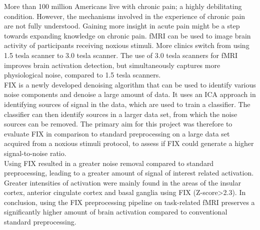 {\small More than 100 million Americans live with chronic pain; a highly debilitating condition. However, the mechanisms involved in the experience of chronic pain are not fully understood. Gaining more insight in acute pain might be a step towards expanding knowledge on chronic pain. fMRI can be used to image brain activity of participants receiving noxious stimuli. More clinics switch from using 1.5 tesla scanner to 3.0 tesla scanner. The use of 3.0 tesla scanners for fMRI improves brain activation detection, but simultaneously captures more physiological noise, compared to 1.5 tesla scanners. \\
FIX is a newly developed denoising algorithm that can be used to identify various noise components and denoise a large amount of data. It uses an ICA approach in identifying sources of signal in the data, which are used to train a classifier. The classifier can then identify sources in a larger data set, from which the noise sources can be removed. The primary aim for this project was therefore to evaluate FIX in comparison to standard preprocessing on a large data set acquired from a noxious stimuli protocol, to assess if FIX could generate a higher signal-to-noise ratio. \\
Using FIX resulted in a greater noise removal compared to standard preprocessing, leading to a greater amount of signal of interest related activation. Greater intensities of activation were mainly found in the areas of the insular cortex, anterior cingulate cortex and basal ganglia using FIX (Z-score>2.3). 
In conclusion, using the FIX preprocessing pipeline on task-related fMRI preserves a significantly higher amount of brain activation compared to conventional standard preprocessing.
\vspace{-0.5cm}}